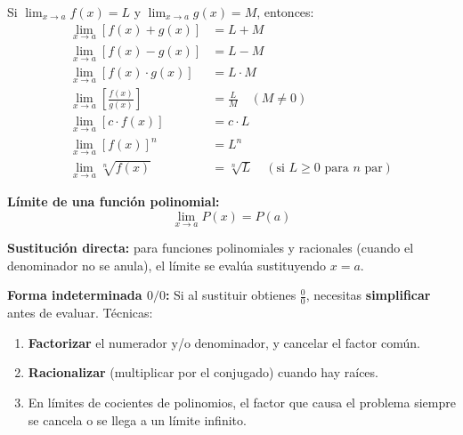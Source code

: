 \documentclass[12pt, a4paper]{article}
\begin{document}
\begin{cuadroteoria}
  Si $\lim_{x \to a} f(x) = L$ y $\lim_{x \to a} g(x) = M$, entonces:
  \begin{align*}
    \lim_{x \to a} [f(x) + g(x)]                  & = L + M                                                               \\
    \lim_{x \to a} [f(x) - g(x)]                  & = L - M                                                               \\
    \lim_{x \to a} [f(x) \cdot g(x)]              & = L \cdot M                                                           \\
    \lim_{x \to a} \left[\frac{f(x)}{g(x)}\right] & = \frac{L}{M} \quad (M \neq 0)                                        \\
    \lim_{x \to a} [c \cdot f(x)]                 & = c \cdot L                                                           \\
    \lim_{x \to a} [f(x)]^n                       & = L^n                                                                 \\
    \lim_{x \to a} \sqrt[n]{f(x)}                 & = \sqrt[n]{L} \quad (\text{si } L \geq 0 \text{ para } n \text{ par})
  \end{align*}

  \textbf{Límite de una función polinomial:}
  $$\lim_{x \to a} P(x) = P(a)$$

  \textbf{Sustitución directa:} para funciones polinomiales y racionales (cuando el denominador no se anula), el límite se evalúa sustituyendo $x = a$.
\end{cuadroteoria}

\begin{cuadroadvertencia}
  \textbf{Forma indeterminada $0/0$:} Si al sustituir obtienes $\frac{0}{0}$, necesitas \textbf{simplificar} antes de evaluar. Técnicas:
  \begin{enumerate}[leftmargin=*]
    \item \textbf{Factorizar} el numerador y/o denominador, y cancelar el factor común.
    \item \textbf{Racionalizar} (multiplicar por el conjugado) cuando hay raíces.
    \item En límites de cocientes de polinomios, el factor que causa el problema siempre se cancela o se llega a un límite infinito.
  \end{enumerate}
\end{cuadroadvertencia}
\end{document}
